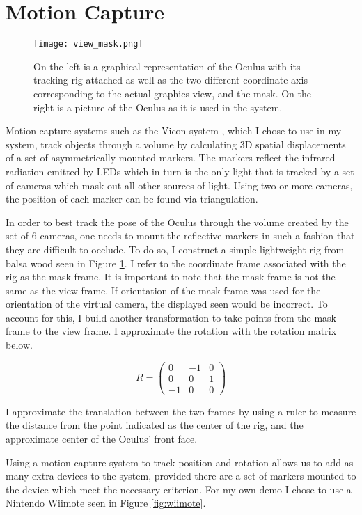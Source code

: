 \section{Motion Capture}
\label{sec:mocap}

\begin{figure}[]
\centering
\texttt{[image: view\_mask.png]}
\caption{On the left is a graphical representation of the Oculus with its
tracking rig attached as well as the two different coordinate axis
corresponding to the actual graphics view, and the mask. On the right
is a picture of the Oculus as it is used in the system.}
\label{fig:mask}
\end{figure}

Motion capture systems such as the Vicon system \cite{website:vicon}, which I
chose to use in my system,  track objects through a volume by calculating 3D
spatial displacements of a set of asymmetrically mounted markers. The markers
reflect the infrared radiation emitted by LEDs which in turn is the only light
that is tracked by a set of cameras which mask out all other sources of light.
Using two or more cameras, the position of each marker can be found via
triangulation.

In order to best track the pose of the Oculus through the volume created by the
set of 6 cameras, one needs to mount the reflective markers in such a fashion
that they are difficult to occlude. To do so, I construct a simple lightweight
rig from balsa wood seen in Figure \ref{fig:mask}. I refer to the coordinate
frame associated with the rig as the mask frame. It is important to note that
the mask frame is not the same as the view frame. If orientation of the mask
frame was used for the orientation of the virtual camera, the displayed seen
would be incorrect. To account for this, I build another transformation to
take points from the mask frame to the view frame. I approximate the rotation
with the rotation matrix below.

\[
R = \begin{pmatrix} 0 & -1 & 0 \\ 0 & 0 & 1 \\ -1 & 0 & 0 \end{pmatrix}
\]

I approximate the translation between the two frames by using a ruler to
measure the distance from the point indicated as the center of the rig, and the
approximate center of the Oculus' front face.

Using a motion capture system to track position and rotation allows us to
add as many extra devices to the system, provided there are a set of markers
mounted to the device which meet the necessary criterion. For my own demo 
I chose to use a Nintendo Wiimote seen in Figure \ref{fig:wiimote}.

